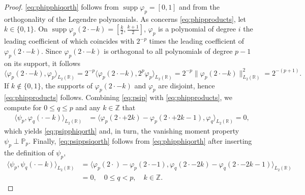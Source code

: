 \documentclass{article}
\DeclareMathOperator{\supp}{supp}
\begin{document}
\begin{proof}
  \eqref{eq:phipphiqorth} follows from $\supp\varphi_p=[0,1]$ and from the orthogonality of the Legendre polynomials. As concerns \eqref{eq:phipproducts}, let $k\in\{0,1\}$. On $\supp\varphi_p(2\cdot-k)=[\frac{k}{2},\frac{k+1}{2}]$,
  $\varphi_p$ is a polynomial of degree $i$ the leading
  coefficient of which coincides with $2^{-p}$ times the leading coefficient of $\varphi_p(2\cdot-k)$.
  Since $\varphi_p(2\cdot-k)$ is orthogonal to all polynomials of degree $p-1$ on its support,
  it follows
  \begin{equation*}
    \big\langle\varphi_p(2\cdot-k),\varphi_p\big\rangle_{L_2(\mathbb R)}
    =
    2^{-p}\big\langle\varphi_p(2\cdot-k),2^p\varphi_p\big\rangle_{L_2(\mathbb R)}
    =
    2^{-p}\big\|\varphi_p(2\cdot-k)\|_{L_2(\mathbb R)}^2
    =
    2^{-(p+1)}.
  \end{equation*}
  If $k\notin\{0,1\}$, the supports of $\varphi_p(2\cdot-k)$ and $\varphi_p$
  are disjoint, hence \eqref{eq:phipproducts} follows.
  Combining \eqref{eq:psip} with \eqref{eq:phipproducts},
  we compute for $0\le q\le p$ and any $k\in\mathbb Z$ that
  \begin{align*}
    \big\langle\psi_p,\varphi_q(\cdot-k)\big\rangle_{L_2(\mathbb R)}
    &=
    \big\langle\varphi_p(2\cdot+2k)-\varphi_p(2\cdot+2k-1),\varphi_q\big\rangle_{L_2(\mathbb R)}
    =0,
  \end{align*}
  which yields \eqref{eq:psipphiqorth} and, in turn, the vanishing moment property
  $\psi_p\perp\mathbb P_p$. Finally, \eqref{eq:psippsiqorth} follows from \eqref{eq:phipphiqorth} after inserting the definition of $\psi_p$,
  \begin{align*}
  \big\langle\psi_p,\psi_q(\cdot-k)\big\rangle_{L_2(\mathbb R)}
  &=
  \big\langle\varphi_p(2\cdot)-\varphi_p(2\cdot-1),\varphi_q(2\cdot-2k)-\varphi_q(2\cdot-2k-1)\big\rangle_{L_2(\mathbb R)}\\
  &=
  0,\quad 0\le q<p,\quad k\in\mathbb Z.
  \end{align*}
\end{proof}
\end{document}
